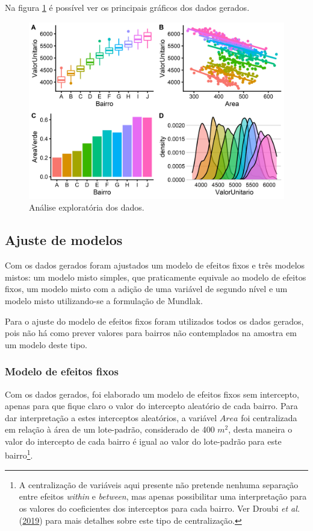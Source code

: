\documentclass[
  a4paper, 11pt]{article}
\begin{document}
Na figura \ref{fig:exploratoria} é possível ver os principais gráficos
dos dados gerados.

\begin{figure}[H]

{\centering \includegraphics[width=1\linewidth]{images/exploratoria-1} 

}

\caption{Análise exploratória dos dados.}\label{fig:exploratoria}
\end{figure}

\hypertarget{ajuste-de-modelos}{%
\subsection{Ajuste de modelos}\label{ajuste-de-modelos}}

Com os dados gerados foram ajustados um modelo de efeitos fixos e três
modelos mistos: um modelo misto simples, que praticamente equivale ao
modelo de efeitos fixos, um modelo misto com a adição de uma variável de
segundo nível e um modelo misto utilizando-se a formulação de Mundlak.

Para o ajuste do modelo de efeitos fixos foram utilizados todos os dados
gerados, pois não há como prever valores para bairros não contemplados
na amostra em um modelo deste tipo.

\hypertarget{modelo-de-efeitos-fixos}{%
\subsubsection{Modelo de efeitos fixos}\label{modelo-de-efeitos-fixos}}

Com os dados gerados, foi elaborado um modelo de efeitos fixos sem
intercepto, apenas para que fique claro o valor do intercepto aleatório
de cada bairro. Para dar interpretação a estes interceptos aleatórios, a
variável \(Area\) foi centralizada em relação à área de um lote-padrão,
considerado de 400 \(m^2\), desta maneira o valor do intercepto de cada
bairro é igual ao valor do lote-padrão para este bairro\footnote{A
  centralização de variáveis aqui presente não pretende nenhuma
  separação entre efeitos \emph{within} e \emph{between}, mas apenas
  possibilitar uma interpretação para os valores do coeficientes dos
  interceptos para cada bairro. Ver Droubi \emph{et al.}
  (\protect\hyperlink{ref-droubi2019}{2019}) para mais detalhes sobre
  este tipo de centralização.}.
\end{document}
